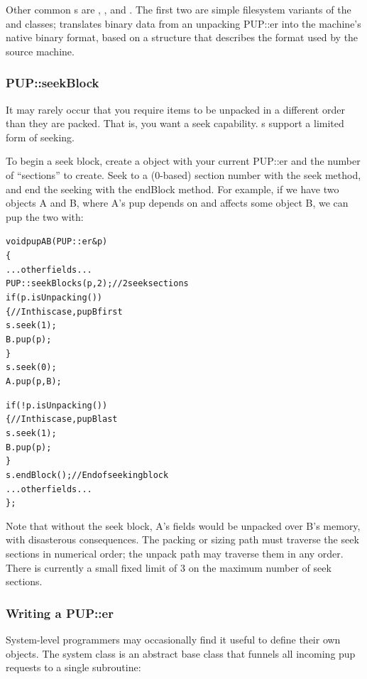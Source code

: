 Other common s are , 
, and .  The first
two are simple filesystem variants of the  
and  classes;  translates
binary data from an unpacking PUP::er into the machine's
native binary format, based on a  structure
that describes the format used by the source machine.


\subsubsection{PUP::seekBlock}

It may rarely occur that you require items to be unpacked
in a different order than they are packed.  That is, you
want a seek capability.  s support a limited 
form of seeking.

To begin a seek block, create a  object
with your current PUP::er and the number of ``sections'' to 
create.  Seek to a (0-based) section number
with the seek method, and end the seeking with the endBlock method.
For example, if we have two objects A and B, where A's pup
depends on and affects some object B, we can pup the two with:

\begin{alltt}
void pupAB(PUP::er &p)
\{
  ... other fields ...
  PUP::seekBlock s(p,2); //2 seek sections
  if (p.isUnpacking()) 
  \{//In this case, pup B first
    s.seek(1);
    B.pup(p);
  \}
  s.seek(0);
  A.pup(p,B);
  
  if (!p.isUnpacking()) 
  \{//In this case, pup B last
    s.seek(1);
    B.pup(p);
  \}
  s.endBlock(); //End of seeking block
  ... other fields ...
\};
\end{alltt}

Note that without the seek block, A's fields would be unpacked
over B's memory, with disasterous consequences.
The packing or sizing path must traverse the seek sections
in numerical order; the unpack path may traverse them in any
order.  There is currently a small fixed limit of 3 on the 
maximum number of seek sections.


\subsubsection{Writing a PUP::er}

System-level programmers may occasionally find it useful to define
their own  objects.  The system  class is 
an abstract base class that funnels all incoming pup requests
to a single subroutine:

